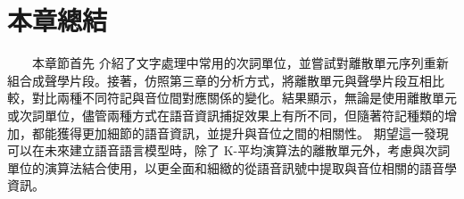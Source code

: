 
\section{本章總結}
　　本章節首先
介紹了文字處理中常用的次詞單位，並嘗試對離散單元序列重新組合成聲學片段。接著，仿照第三章的分析方式，將離散單元與聲學片段互相比較，對比兩種不同符記與音位間對應關係的變化。結果顯示，無論是使用離散單元或次詞單位，儘管兩種方式在語音資訊捕捉效果上有所不同，但隨著符記種類的增加，都能獲得更加細節的語音資訊，並提升與音位之間的相關性。
期望這一發現可以在未來建立語音語言模型時，除了 K-平均演算法的離散單元外，考慮與次詞單位的演算法結合使用，以更全面和細緻的從語音訊號中提取與音位相關的語音學資訊。  %
